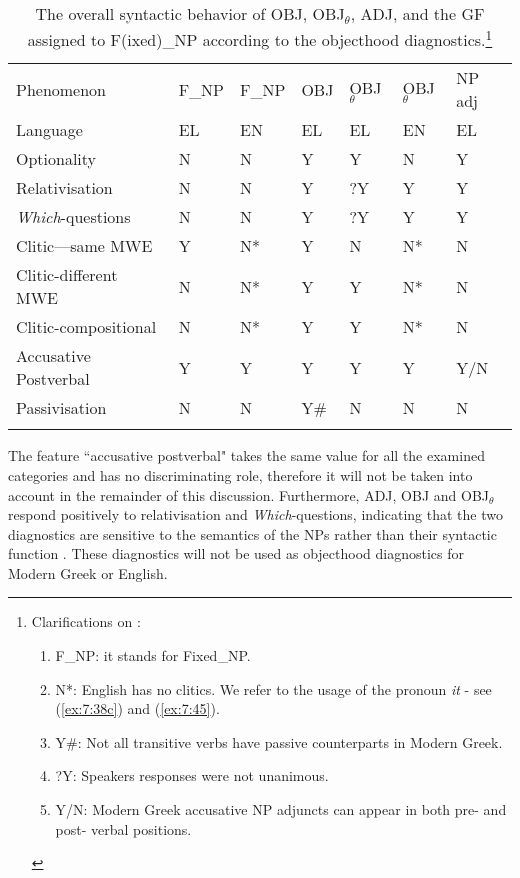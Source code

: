 \documentclass[output=paper]{langsci/langscibook}
\begin{document}
\begin{table}[b]
\begin{tabularx}{\textwidth}{Xllllll}
\lsptoprule
Phenomenon & F\_NP  & F\_NP  & OBJ  &  OBJ$_\theta$  &  OBJ$_\theta$  & NP adj \\
Language & EL & EN & EL & EL & EN & EL \\
\midrule
Optionality & N & N & Y & Y & N & Y\\
Relativisation & N & N & Y & ?Y & Y & Y\\
\textit{Which}-questions & N & N & Y & ?Y & Y & Y\\
Clitic—same MWE & Y & N* & Y & N &  N* & N\\
Clitic-different MWE & N & N* & Y & Y & N*  & N\\
Clitic-compositional  & N & N* & Y & Y & N* & N\\
Accusative Postverbal &  Y  & Y &  Y  &  Y  & Y &  Y/N\\
Passivisation & N & N & Y\# & N & N & N\\
\lspbottomrule
\end{tabularx}

\caption[The overall syntactic behavior of OBJ, OBJ$_\theta$, ADJ, and the GF assigned to Fixed\_NP according to the objecthood diagnostics]{The overall syntactic behavior of OBJ, OBJ$_\theta$, ADJ, and the GF assigned to F(ixed)\_NP according to the objecthood diagnostics.\footnote{Clarifications on :
\begin{enumerate}
\item F\_NP: it stands for Fixed\_NP.
\item N*: English has no clitics. We refer to the usage of the pronoun \textit{it} - see (\ref{ex:7:38c}) and (\ref{ex:7:45}).
\item Y\#: Not all transitive verbs have passive counterparts in Modern Greek.
\item ?Y: Speakers responses were not unanimous.
\item Y/N: Modern Greek accusative NP adjuncts can appear in both pre- and post- verbal positions.
\end{enumerate}}}
\label{tab:1}
\end{table}

The feature ``accusative postverbal" takes the same value for all   the examined categories and has no discriminating role, therefore it will not be taken into account in the remainder of this discussion. Furthermore,  ADJ, OBJ and OBJ$_\theta$ respond positively to relativisation and \textit{Which}-questions, indicating that the two diagnostics are sensitive to the semantics of the NPs rather than their syntactic function \citep{kaysagidioms}. These diagnostics will not be used as objecthood diagnostics for Modern Greek or English. 
\end{document}
